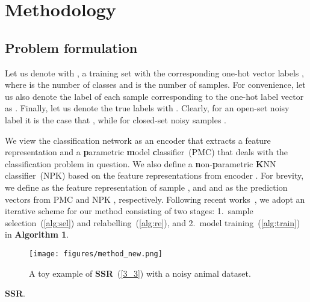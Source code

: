 \documentclass{bmvc2k}
\begin{document}
\section{Methodology}
\label{3}
\subsection{Problem formulation}
\label{3_1}
Let us denote with , a training set with the corresponding one-hot vector labels , where  is the number of classes and  is the number of samples.
For convenience, let us also denote the label of each sample  corresponding to the one-hot label vector  as . 
Finally, let us denote the true labels with . Clearly, for an open-set noisy label it is the case that , while for closed-set noisy samples .

We view the classification network as an encoder  that extracts a feature representation and a \textbf{p}arametric \textbf{m}odel \textbf{c}lassifier~(PMC)  that deals with the classification problem in question. We also define a \textbf{n}on-\textbf{p}arametric \textbf{K}NN classifier~(NPK)  based on the feature representations from encoder .
For brevity, we define  as the feature representation of sample , and  and  as the prediction vectors from PMC  and NPK , respectively. Following recent works~\citep{dividemix, ngc, moit, coteaching, coteaching+}, we adopt an iterative scheme for our method consisting of two stages: 1.~sample selection~(\cref{alg:sel}) and relabelling~(\cref{alg:re}), and 2.~model training~(\cref{alg:train}) in \textbf{Algorithm 1}. 




\begin{figure}[t]
    \begin{center}
    \texttt{[image: figures/method\_new.png]}
    \end{center}
\caption{A toy example of \textbf{SSR}~(\cref{3_3}) with a noisy animal dataset.}
    \label{fig:ssr}
\end{figure}

\begin{algorithm}[H]
\SetAlgoLined
{}
\caption{\textbf{SSR}. }
\label{alg}
\end{algorithm}
\end{document}
